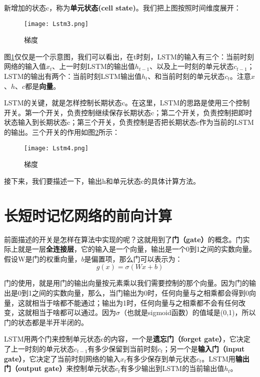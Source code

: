 新增加的状态c，称为\textbf{单元状态(cell state)}。我们把上图按照时间维度展开：
\begin{figure}[!h]
	\centering
	\texttt{[image: Lstm3.png]}
	\caption{梯度}
	\label{fig:Lstm3}
\end{figure}

图\ref{fig:Lstm3}仅仅是一个示意图，我们可以看出，在t时刻，LSTM的输入有三个：当前时刻网络的输入值\({x}_t\)、上一时刻LSTM的输出值\({h}_{t-1}\)、以及上一时刻的单元状态\({c}_{t-1}\)；LSTM的输出有两个：当前时刻LSTM输出值\({h}_t\)、和当前时刻的单元状态\({c}_t\)。注意\({x}\)、\({h}\)、\({c}\)都是\textbf{向量}。

LSTM的关键，就是怎样控制长期状态c。在这里，LSTM的思路是使用三个控制开关。第一个开关，负责控制继续保存长期状态c；第二个开关，负责控制把即时状态输入到长期状态c；第三个开关，负责控制是否把长期状态c作为当前的LSTM的输出。三个开关的作用如图\ref{fig:Lstm4}所示：

\begin{figure}[!h]
	\centering
	\texttt{[image: Lstm4.png]}
	\caption{梯度}
	\label{fig:Lstm4}
\end{figure}


接下来，我们要描述一下，输出h和单元状态c的具体计算方法。

\section{长短时记忆网络的前向计算}\label{Lstm:2}

前面描述的开关是怎样在算法中实现的呢？这就用到了\textbf{门（gate）}的概念。门实际上就是一层\textbf{全连接层}，它的输入是一个向量，输出是一个0到1之间的实数向量。假设W是门的权重向量，\({b}\)是偏置项，那么门可以表示为：
\[
	g({x})=\sigma(W{x}+{b})
\]

门的使用，就是用门的输出向量按元素乘以我们需要控制的那个向量。因为门的输出是0到1之间的实数向量，那么，当门输出为0时，任何向量与之相乘都会得到0向量，这就相当于啥都不能通过；输出为1时，任何向量与之相乘都不会有任何改变，这就相当于啥都可以通过。因为\(\sigma\)（也就是sigmoid函数）的值域是(0,1)，所以门的状态都是半开半闭的。

LSTM用两个门来控制单元状态c的内容，一个是\textbf{遗忘门（forget gate）}，它决定了上一时刻的单元状态\({c}_{t-1}\)有多少保留到当前时刻\({c}_t\)；另一个是\textbf{输入门（input gate）}，它决定了当前时刻网络的输入\({x}_t\)有多少保存到单元状态\({c}_t\)。LSTM用\textbf{输出门（output gate）}来控制单元状态\({c}_t\)有多少输出到LSTM的当前输出值\({h}_t\)。

